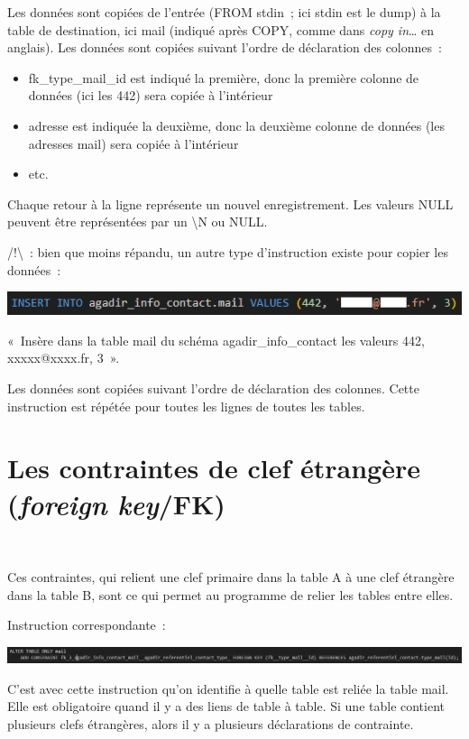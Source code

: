 Les données sont copiées de l'entrée (FROM stdin~; ici stdin est le
dump) à la table de destination, ici mail (indiqué après COPY, comme
dans \emph{copy in}\ldots{} en anglais). Les données sont copiées
suivant l'ordre de déclaration des colonnes~:

\begin{itemize}
	\item
	fk\_type\_mail\_id est indiqué la première, donc la première colonne
	de données (ici les 442) sera copiée à l'intérieur
	\item
	adresse est indiquée la deuxième, donc la deuxième colonne de données
	(les adresses mail) sera copiée à l'intérieur
	\item
	etc.
\end{itemize}

Chaque retour à la ligne représente un nouvel enregistrement. Les
valeurs NULL peuvent être représentées par un \textbackslash N ou NULL.

/!\textbackslash~: bien que moins répandu, un autre type d'instruction
existe pour copier les données~:

\includegraphics{annexes/image7.PNG}

«~Insère dans la table mail du schéma agadir\_info\_contact les valeurs
442, xxxxx@xxxx.fr, 3~».

Les données sont copiées suivant l'ordre de déclaration des colonnes.
Cette instruction est répétée pour toutes les lignes de toutes les
tables.

\section*{Les contraintes de clef étrangère (\emph{foreign key}/FK)}~

Ces contraintes, qui relient une clef primaire dans la table A à une
clef étrangère dans la table B, sont ce qui permet au programme de
relier les tables entre elles.

Instruction correspondante~:

\includegraphics[width=\textwidth]{annexes/image8.png}

C'est avec cette instruction qu'on identifie à quelle table est reliée
la table mail. Elle est obligatoire quand il y a des liens de table à
table. Si une table contient plusieurs clefs étrangères, alors il y a
plusieurs déclarations de contrainte.

